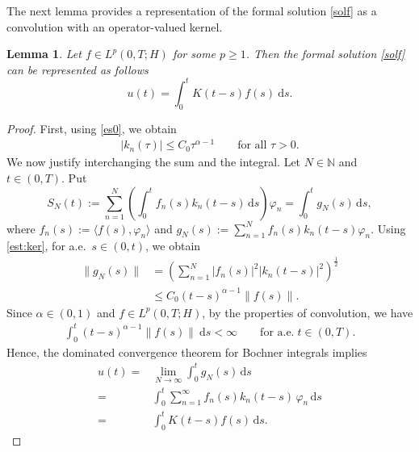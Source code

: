 \documentclass[reqno]{amsart}
\newtheorem{lem}[theorem]{Lemma}
\numberwithin{equation}{section}
\def \d {\mathrm{d}}
\begin{document}
The next lemma provides a representation of the formal solution \eqref{solf} as a convolution with an operator-valued kernel.
\begin{lem}\label{lm:rep}
    Let $f\in L^p(0,T;H)$ for some $p\ge 1$. Then the formal solution \eqref{solf} can be represented as follows
    \begin{equation}\label{representation}
        u(t)=\int_{0}^{t}K(t-s)f(s)~\d s.
    \end{equation}
\end{lem}
\begin{proof}
First, using \eqref{es0}, we obtain
\begin{align}
    |k_n(\tau)|\leq C_{0}\tau^{\alpha-1} \qquad \text{for all } \tau>0. \label{est:ker}
\end{align} 
We now justify interchanging the sum and the integral. Let $N\in\mathbb{N}$ and $t\in (0,T)$. Put
$$S_N(t) := \sum_{n=1}^N \left( \int_0^t f_n(s) k_n(t-s) \, \d s \right) \varphi_n = \int_0^t g_N(s) \, \d s,$$ where $f_n(s):=\langle f(s),\varphi_n\rangle$ and $g_N(s) := \displaystyle\sum_{n=1}^N f_n(s) k_n(t-s) \varphi_n$.  
Using \eqref{est:ker}, for a.e.\ $s\in(0,t)$, we obtain
\begin{align*}
	\|g_N(s)\|&=\left(\sum_{n=1}^N |f_n(s)|^2 |k_n(t-s)|^2 \right)^{\frac{1}{2}}\\
	&\leq C_0 (t-s)^{\alpha-1}\|f(s)\|.
\end{align*}
Since $\alpha\in (0,1)$ and $f\in L^p(0,T;H)$, by the properties of convolution, we have
\begin{align*}
    \int_{0}^{t}(t-s)^{\alpha-1}\|f(s)\|~\d s <\infty\qquad \mbox{for a.e.}\; t\in (0,T).
\end{align*}
Hence, the dominated convergence theorem for Bochner integrals implies
\begin{align*}
    u(t)=& \lim_{N\to\infty} \int_0^t g_N(s)\, \d s\\
    =& \int_0^t \sum_{n=1}^\infty f_n(s) k_n(t-s)\, \varphi_n \, \d s\\
    =& \int_0^t K(t-s)f(s)\, \d s.
\end{align*}
\end{proof}
\end{document}
